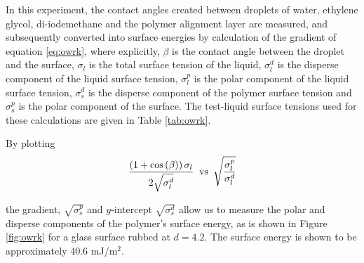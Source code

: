 In this experiment, the contact angles created between droplets of water, ethylene glycol, di-iodemethane and the polymer alignment layer are measured, and subsequently converted into surface energies by calculation of the gradient of equation \ref{eq:owrk}, where explicitly, $\beta$ is the contact angle between the droplet and the surface, $\sigma_l$ is the total surface tension of the liquid, $\sigma_l^d$ is the disperse component of the liquid surface tension, $\sigma_l^p$ is the polar component of the liquid surface tension, $\sigma_s^d$ is the disperse component of the polymer surface tension and $\sigma_s^p$ is the polar component of the surface. The test-liquid surface tensions used for these calculations are given in Table \ref{tab:owrk}.

By plotting
\begin{equation}
\frac{\left(1+\cos\left(\beta\right)\right)\sigma_l}{2\sqrt{\sigma_l^d}} \text{\hspace{0.7mm} vs \hspace{0.7mm}} \sqrt{\frac{\sigma_l^p}{\sigma_l^d}}
\end{equation}

the gradient, $\sqrt{\sigma_s^p}$ and $y$-intercept $\sqrt{\sigma_s^d}$ allow us to measure the polar and disperse components of the polymer's surface energy, as is shown in Figure \ref{fig:owrk} for a glass surface rubbed at $d=4.2$. The surface energy is shown to be approximately 40.6 mJ/m$^2$.

